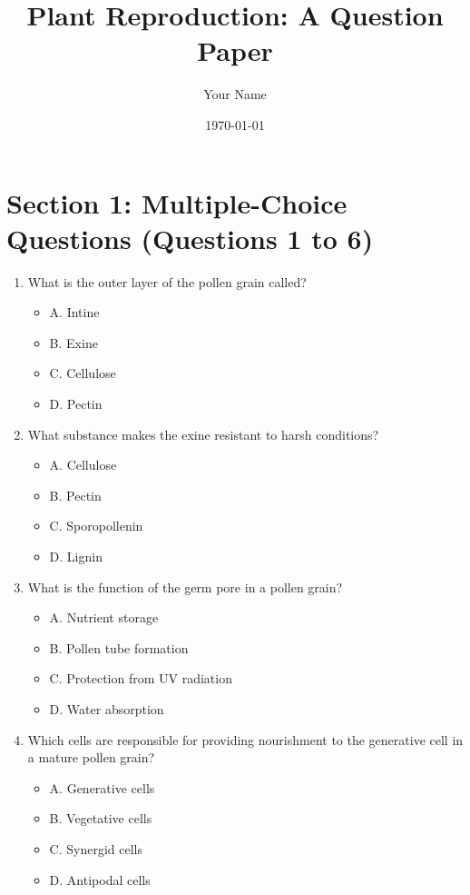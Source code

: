 \documentclass{article}
\title{Plant Reproduction: A Question Paper}
\author{Your Name}
\date{\today}
\begin{document}
\maketitle

\section*{Section 1: Multiple-Choice Questions (Questions 1 to 6)}

\begin{enumerate}
    \item What is the outer layer of the pollen grain called?
        \begin{itemize}
            \item A. Intine
            \item B. Exine
            \item C. Cellulose
            \item D. Pectin
        \end{itemize}
        
    \item What substance makes the exine resistant to harsh conditions?
        \begin{itemize}
            \item A. Cellulose
            \item B. Pectin
            \item C. Sporopollenin
            \item D. Lignin
        \end{itemize}
        
    \item What is the function of the germ pore in a pollen grain?
        \begin{itemize}
            \item A. Nutrient storage
            \item B. Pollen tube formation
            \item C. Protection from UV radiation
            \item D. Water absorption
        \end{itemize}
        
    \item Which cells are responsible for providing nourishment to the generative cell in a mature pollen grain?
        \begin{itemize}
            \item A. Generative cells
            \item B. Vegetative cells
            \item C. Synergid cells
            \item D. Antipodal cells
        \end{itemize}
        

\end{enumerate}
\end{document}
